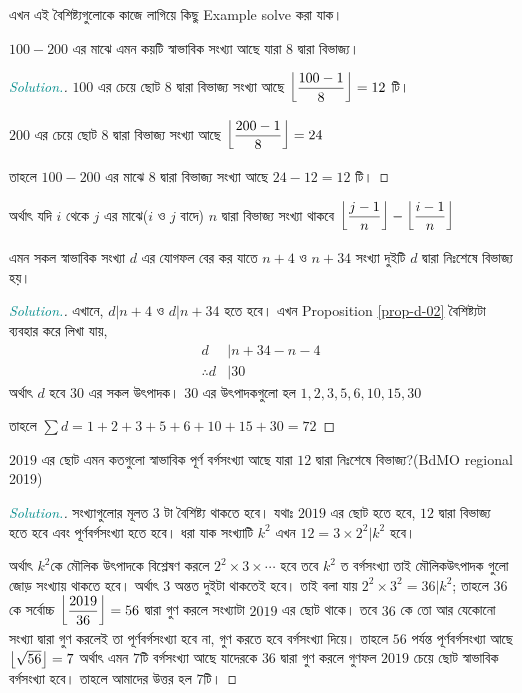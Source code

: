 \documentclass[a4paper,11pt]{article}
\newcommand{\dd}{\displaystyle}
\DeclarePairedDelimiter\floor{\lfloor}{\rfloor}
\newenvironment{sltn}{\begin{proof}[\emph{\textcolor{darkcyan}{Solution.}}]} {\end{proof}}
\begin{document}
এখন এই বৈশিষ্ট্যগুলোকে কাজে লাগিয়ে কিছু Example solve করা যাক। 

\begin{xmpl}
	$100-200$ এর মাঝে এমন কয়টি স্বাভাবিক সংখ্যা আছে যারা $8$ দ্বারা বিভাজ্য। 
\end{xmpl}
\begin{sltn}
	$100$ এর চেয়ে ছোট $8$ দ্বারা বিভাজ্য সংখ্যা আছে $\floor*{\dfrac{100-1}{8}}=12$ টি। 
	
	$200$ এর চেয়ে ছোট $8$ দ্বারা বিভাজ্য সংখ্যা আছে $\floor*{\dfrac{200-1}{8}}=24$
	
	তাহলে $100-200$ এর মাঝে $8$ দ্বারা বিভাজ্য সংখ্যা আছে $24-12=12$ টি। 
\end{sltn}
অর্থাৎ যদি $i$ থেকে $j$ এর মাঝে($i$ ও $j$ বাদে) $n$ দ্বারা বিভাজ্য সংখ্যা থাকবে $\floor*{\dfrac{j-1}{n}}-\floor*{\dfrac{i-1}{n}}$
\begin{xmpl}
	\label{xmpl-1}
	
	এমন সকল স্বাভাবিক সংখ্যা $d$ এর যোগফল বের কর যাতে $n+4$ ও $n+34$ সংখ্যা দুইটি $d$ দ্বারা নিঃশেষে বিভাজ্য হয়। 
\end{xmpl}

\begin{sltn}
	এখানে, $d|n+4$ ও $d|n+34$ হতে হবে। এখন Proposition \ref{prop-d-02} বৈশিষ্ট্যটা ব্যবহার করে লিখা যায়, 
	\begin{align*}
		d            & |n+34-n-4 \\
		\therefore d & |30
	\end{align*}
	অর্থাৎ $d$ হবে $30$ এর সকল উৎপাদক। $30$ এর উৎপাদকগুলো হল $1,2,3,5,6,10,15,30$
	
	তাহলে $\dd \sum d = 1+2+3+5+6+10+15+30=72$
\end{sltn}

\begin{xmpl}
	$2019$ এর ছোট এমন কতগুলো স্বাভাবিক পূর্ণ বর্গসংখ্যা আছে যারা $12$ দ্বারা নিঃশেষে বিভাজ্য?(BdMO regional 2019)
\end{xmpl}

\begin{sltn}
	সংখ্যাগুলোর মূলত $3$ টা বৈশিষ্ট্য থাকতে হবে। যথাঃ $2019$ এর ছোট হতে হবে, $12$ দ্বারা বিভাজ্য হতে হবে এবং পূর্ণবর্গসংখ্যা হতে হবে। ধরা যাক সংখ্যাটি $k^2$ এখন $12=3\times 2^2|k^2$ হবে। 
	
	অর্থাৎ $k^2$কে মৌলিক উৎপাদকে বিশ্লেষণ করলে $2^2\times 3 \times \cdots $ হবে তবে $k^2$ ত বর্গসংখ্যা তাই মৌলিকউৎপাদক গুলো জোড় সংখ্যায় থাকতে হবে। অর্থাৎ $3$ অন্তত দুইটা থাকতেই হবে। তাই বলা যায় $2^2\times 3^2=36|k^2$; তাহলে $36$কে সর্বোচ্চ $\floor*{\dfrac{2019}{36}}=56$ দ্বারা গুণ করলে সংখ্যাটা $2019$ এর ছোট থাকে। 
	তবে $36$ কে তো আর যেকোনো সংখ্যা দ্বারা গুণ করলেই তা পূর্ণবর্গসংখ্যা হবে না, গুণ করতে হবে বর্গসংখ্যা দিয়ে। তাহলে $56$ পর্যন্ত পূর্ণবর্গসংখ্যা আছে $\floor*{\sqrt{56}}=7$ অর্থাৎ এমন $7$টি বর্গসংখ্যা আছে যাদেরকে $36$ দ্বারা গুণ করলে গুণফল $2019$ চেয়ে ছোট স্বাভাবিক বর্গসংখ্যা হবে। তাহলে আমাদের উত্তর হল $7$টি। 
\end{sltn}
\end{document}
